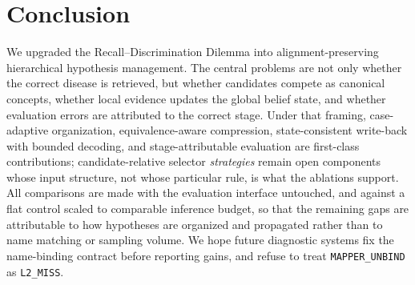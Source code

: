 \section{Conclusion}
\label{sec:conclusion}

We upgraded the Recall--Discrimination Dilemma into alignment-preserving hierarchical hypothesis management.
The central problems are not only whether the correct disease is retrieved, but whether candidates compete as canonical concepts, whether local evidence updates the global belief state, and whether evaluation errors are attributed to the correct stage.
Under that framing, case-adaptive organization, equivalence-aware compression, state-consistent write-back with bounded decoding, and stage-attributable evaluation are first-class contributions; candidate-relative selector \emph{strategies} remain open components whose input structure, not whose particular rule, is what the ablations support.
All comparisons are made with the evaluation interface untouched, and against a flat control scaled to comparable inference budget, so that the remaining gaps are attributable to how hypotheses are organized and propagated rather than to name matching or sampling volume.
We hope future diagnostic systems fix the name-binding contract before reporting gains, and refuse to treat \texttt{MAPPER\_UNBIND} as \texttt{L2\_MISS}.
